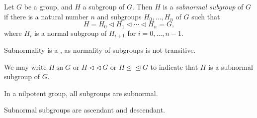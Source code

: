 \documentclass[12pt]{article}
\def\normal{\triangleleft}
\def\normaleq{\trianglelefteq}
\def\sn{\operatorname{sn}}
\begin{document}
Let $G$ be a group, and $H$ a subgroup of $G$.
Then $H$ is a \emph{subnormal subgroup} of $G$ 
if there is a natural number $n$ and subgroups $H_0,\dots,H_n$ of $G$ 
such that $$H=H_0\normal H_1\normal\cdots\normal H_n=G,$$
where $H_i$ is a normal subgroup of $H_{i+1}$ for $i=0,\dots,n-1$.

Subnormality is a ,
as normality of subgroups is not transitive.

We may write $H\sn G$ or $H\normal\normal\, G$ or $H\!\normaleq\normaleq G$ to indicate that $H$ is a subnormal subgroup of $G$.

In a nilpotent group, all subgroups are subnormal.

Subnormal subgroups are ascendant and descendant.
\end{document}
